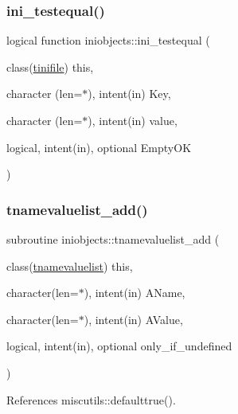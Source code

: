\mbox{\label{namespaceiniobjects_aef66a5c954f63ad0935b093198bfde8a}} 
\subsubsection{\texorpdfstring{ini\+\_\+testequal()}{ini\_testequal()}}
{\footnotesize\ttfamily logical function iniobjects\+::ini\+\_\+testequal (\begin{DoxyParamCaption}\item[{class(\mbox{\hyperlink{structiniobjects_1_1tinifile}{tinifile}})}]{this,  }\item[{character (len=$\ast$), intent(in)}]{Key,  }\item[{character (len=$\ast$), intent(in)}]{value,  }\item[{logical, intent(in), optional}]{Empty\+OK }\end{DoxyParamCaption})\hspace{0.3cm}{\ttfamily [private]}}

\mbox{\label{namespaceiniobjects_a0bf091b688bae891c20047d3b5bfca2a}} 
\subsubsection{\texorpdfstring{tnamevaluelist\+\_\+add()}{tnamevaluelist\_add()}}
{\footnotesize\ttfamily subroutine iniobjects\+::tnamevaluelist\+\_\+add (\begin{DoxyParamCaption}\item[{class(\mbox{\hyperlink{structiniobjects_1_1tnamevaluelist}{tnamevaluelist}})}]{this,  }\item[{character(len=$\ast$), intent(in)}]{A\+Name,  }\item[{character(len=$\ast$), intent(in)}]{A\+Value,  }\item[{logical, intent(in), optional}]{only\+\_\+if\+\_\+undefined }\end{DoxyParamCaption})\hspace{0.3cm}{\ttfamily [private]}}



References miscutils\+::defaulttrue().

